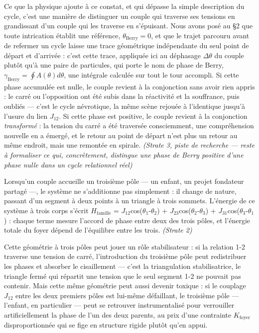 \documentclass[french, 11pt, twoside, openright, a5paper]{book}
\newcommand{\soussection}[1]{%
  \addcontentsline{toc}{section}{#1}%
  \vspace{1.5em plus 0.4em minus 0.2em}%
  \noindent{\large\bfseries #1}\par\nobreak\vspace{0.6em}%
}
\begin{document}
Ce que la physique ajoute à ce constat, et qui dépasse la simple
description du cycle, c'est une manière de distinguer un couple qui
traverse ses tensions en grandissant d'un couple qui les traverse en
s'épuisant. Nous avons posé au §2 que toute intrication établit une
référence, $\theta_{\text{Berry}} = 0$, et que le trajet parcouru avant de refermer un
cycle laisse une trace géométrique indépendante du seul point de départ
et d'arrivée : c'est cette trace, appliquée ici au déphasage $\Delta\theta$ du
couple plutôt qu'à une paire de particules, qui porte le nom de phase de
Berry, $\gamma_{\text{Berry}} = \oint A(\theta) d\theta$, une intégrale calculée sur tout le tour
accompli. Si cette phase accumulée est nulle, le couple revient à la
conjonction sans avoir rien appris : le carré ou l'opposition ont été
subis dans la réactivité et la souffrance, puis oubliés --- c'est le
cycle névrotique, la même scène rejouée à l'identique jusqu'à l'usure du
lien $J_{12}$. Si cette phase est positive, le couple revient à la
conjonction \emph{transformé} : la tension du carré a été traversée
consciemment, une compréhension nouvelle en a émergé, et le retour au
point de départ n'est plus un retour au même endroit, mais une remontée
en spirale. \emph{(Strate 3, piste de recherche --- reste à formaliser
ce qui, concrètement, distingue une phase de Berry positive d'une phase
nulle dans un cycle relationnel réel)}




\soussection{Le triangle familial}

Lorsqu'un couple accueille un troisième pôle --- un enfant, un projet
fondateur partagé ---, le système ne s'additionne pas simplement : il
change de nature, passant d'un segment à deux points à un triangle à
trois sommets. L'énergie de ce système à trois corps s'écrit $H_{\text{famille}}$
= $J_{12}$cos($\theta_1$-$\theta_2$) + $J_{23}$cos($\theta_2$-$\theta_3$) + $J_{31}$cos($\theta_3$-$\theta_1$) : chaque terme mesure
l'accord de phase entre deux des trois pôles, et l'énergie totale du
foyer dépend de l'équilibre entre les trois. \emph{(Strate 2)}

Cette géométrie à trois pôles peut jouer un rôle stabilisateur : si la
relation 1-2 traverse une tension de carré, l'introduction du troisième
pôle peut redistribuer les phases et absorber le cisaillement --- c'est
la triangulation stabilisatrice, le triangle fermé qui répartit une
tension que le seul segment 1-2 ne pouvait pas contenir. Mais cette même
géométrie peut aussi devenir toxique : si le couplage $J_{12}$ entre les deux
premiers pôles est lui-même défaillant, le troisième pôle --- l'enfant,
en particulier --- peut se retrouver instrumentalisé pour verrouiller
artificiellement la phase de l'un des deux parents, au prix d'une
contrainte $K_{\text{foyer}}$ disproportionnée qui se fige en structure rigide
plutôt qu'en appui.
\end{document}
